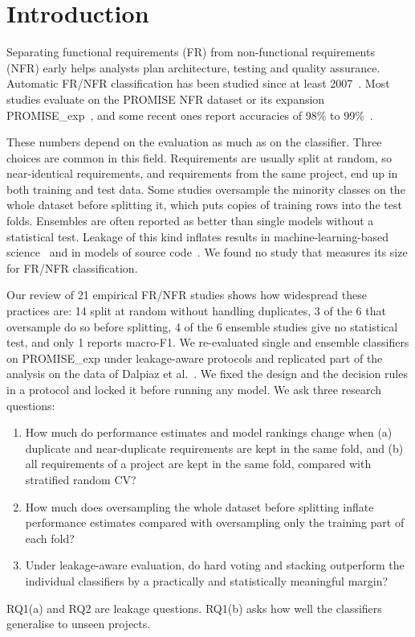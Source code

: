 \section{Introduction}
\label{sec:intro}

Separating functional requirements (FR) from non-functional requirements (NFR) early helps analysts plan architecture, testing and quality assurance. Automatic FR/NFR classification has been studied since at least 2007~\cite{clelandhuang2007,kurtanovic2017,abad2017what}. Most studies evaluate on the PROMISE NFR dataset or its expansion PROMISE\_exp~\cite{lima2019}, and some recent ones report accuracies of 98\% to 99\%~\cite{metu2024hybrid,baskoro2021systematic}.

These numbers depend on the evaluation as much as on the classifier. Three choices are common in this field. Requirements are usually split at random, so near-identical requirements, and requirements from the same project, end up in both training and test data. Some studies oversample the minority classes on the whole dataset before splitting it, which puts copies of training rows into the test folds. Ensembles are often reported as better than single models without a statistical test. Leakage of this kind inflates results in machine-learning-based science~\cite{kaufman2012,kapoor2023} and in models of source code~\cite{allamanis2019adverse}. We found no study that measures its size for FR/NFR classification.

Our review of 21 empirical FR/NFR studies shows how widespread these practices are: 14 split at random without handling duplicates, 3 of the 6 that oversample do so before splitting, 4 of the 6 ensemble studies give no statistical test, and only 1 reports macro-F1. We re-evaluated single and ensemble classifiers on PROMISE\_exp under leakage-aware protocols and replicated part of the analysis on the data of Dalpiaz et al.~\cite{dalpiaz2019}. We fixed the design and the decision rules in a protocol and locked it before running any model. We ask three research questions:
\begin{enumerate}
\item[\textbf{RQ1}] How much do performance estimates and model rankings change when (a) duplicate and near-duplicate requirements are kept in the same fold, and (b) all requirements of a project are kept in the same fold, compared with stratified random CV?
\item[\textbf{RQ2}] How much does oversampling the whole dataset before splitting inflate performance estimates compared with oversampling only the training part of each fold?
\item[\textbf{RQ3}] Under leakage-aware evaluation, do hard voting and stacking outperform the individual classifiers by a practically and statistically meaningful margin?
\end{enumerate}
RQ1(a) and RQ2 are leakage questions. RQ1(b) asks how well the classifiers generalise to unseen projects.

